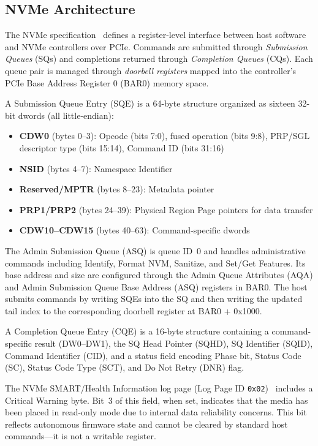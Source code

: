 \documentclass[conference]{IEEEtran}
\begin{document}
\subsection{NVMe Architecture}
\label{sec:nvme-arch}

The NVMe specification~\cite{nvme-spec-2.0} defines a register-level
interface between host software and NVMe controllers over PCIe. Commands
are submitted through \emph{Submission Queues} (SQs) and completions
returned through \emph{Completion Queues} (CQs). Each queue pair is
managed through \emph{doorbell registers} mapped into the controller's
PCIe Base Address Register 0 (BAR0) memory space.

A Submission Queue Entry (SQE) is a 64-byte structure organized as
sixteen 32-bit dwords (all little-endian):
\begin{itemize}
\item \textbf{CDW0} (bytes 0--3): Opcode (bits 7:0), fused operation
  (bits 9:8), PRP/SGL descriptor type (bits 15:14), Command ID
  (bits 31:16)
\item \textbf{NSID} (bytes 4--7): Namespace Identifier
\item \textbf{Reserved/MPTR} (bytes 8--23): Metadata pointer
\item \textbf{PRP1/PRP2} (bytes 24--39): Physical Region Page pointers
  for data transfer
\item \textbf{CDW10--CDW15} (bytes 40--63): Command-specific dwords
\end{itemize}

The Admin Submission Queue (ASQ) is queue ID~0 and handles
administrative commands including Identify, Format NVM, Sanitize, and
Set/Get Features. Its base address and size are configured through the
Admin Queue Attributes (AQA) and Admin Submission Queue Base Address
(ASQ) registers in BAR0. The host submits commands by writing SQEs into
the SQ and then writing the updated tail index to the corresponding
doorbell register at BAR0 + 0x1000.

A Completion Queue Entry (CQE) is a 16-byte structure containing a
command-specific result (DW0--DW1), the SQ Head Pointer (SQHD), SQ
Identifier (SQID), Command Identifier (CID), and a status field encoding
Phase bit, Status Code (SC), Status Code Type (SCT), and Do Not Retry
(DNR) flag.

The NVMe SMART/Health Information log page (Log Page ID
\texttt{0x02})~\cite{nvme-spec-2.0} includes a Critical Warning byte.
Bit~3 of this field, when set, indicates that the media has been placed
in read-only mode due to internal data reliability concerns. This bit
reflects autonomous firmware state and cannot be cleared by standard
host commands---it is not a writable register.
\end{document}
